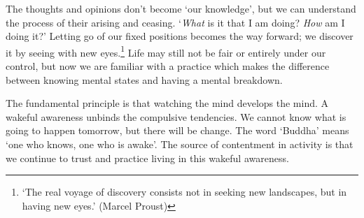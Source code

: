The thoughts and opinions don't become `our knowledge', but we can
understand the process of their arising and ceasing. `\emph{What} is it
that I am doing? \emph{How} am I doing it?' Letting go of our fixed
positions becomes the way forward; we discover it by seeing with new
eyes.\footnote{`The real voyage of discovery consists not in seeking new
  landscapes, but in having new eyes.' (Marcel Proust)} Life may still
not be fair or entirely under our control, but now we are familiar with
a practice which makes the difference between knowing mental states and
having a mental breakdown.

The fundamental principle is that watching the mind develops the mind. A
wakeful awareness unbinds the compulsive tendencies. We cannot know what
is going to happen tomorrow, but there will be change. The word `Buddha'
means `one who knows, one who is awake'. The source of contentment in
activity is that we continue to trust and practice living in this
wakeful awareness.

